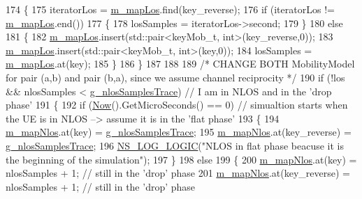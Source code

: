 \begin{DoxyCode}
174         \{
175                 iteratorLos = \hyperlink{classns3_1_1MmWaveLosTracker_a1ccd3a19ade5ca4b1e94bd113c593cd3}{m\_mapLos}.find(key\_reverse);
176                 \textcolor{keywordflow}{if} (iteratorLos != \hyperlink{classns3_1_1MmWaveLosTracker_a1ccd3a19ade5ca4b1e94bd113c593cd3}{m\_mapLos}.end())
177                 \{
178                         losSamples = iteratorLos->second;
179                 \} 
180                 \textcolor{keywordflow}{else}
181                 \{
182                         \hyperlink{classns3_1_1MmWaveLosTracker_a1ccd3a19ade5ca4b1e94bd113c593cd3}{m\_mapLos}.insert(std::pair<keyMob\_t, int>(key\_reverse,0));
183                         \hyperlink{classns3_1_1MmWaveLosTracker_a1ccd3a19ade5ca4b1e94bd113c593cd3}{m\_mapLos}.insert(std::pair<keyMob\_t, int>(key,0));
184                         losSamples = \hyperlink{classns3_1_1MmWaveLosTracker_a1ccd3a19ade5ca4b1e94bd113c593cd3}{m\_mapLos}.at(key);
185                 \}
186         \}
187 
188 
189         \textcolor{comment}{/* CHANGE BOTH MobilityModel for pair (a,b) and pair (b,a), since we assume channel reciprocity */}
190         \textcolor{keywordflow}{if} (!los && nlosSamples < \hyperlink{namespacens3_aa27c343924716ad4dac244babcba8297}{g\_nlosSamplesTrace}) \textcolor{comment}{// I am in NLOS and in the 'drop
       phase'}
191         \{
192                 \textcolor{keywordflow}{if} (\hyperlink{group__simulator_gac3635e2e87f7ce316c89290ee1b01d0d}{Now}().GetMicroSeconds() == 0) \textcolor{comment}{// simualtion starts when the UE is in NLOS --> assume
       it is in the 'flat phase'}
193                 \{
194                         \hyperlink{classns3_1_1MmWaveLosTracker_ab8a492fa8798f2f775de311a6e619b19}{m\_mapNlos}.at(key) = \hyperlink{namespacens3_aa27c343924716ad4dac244babcba8297}{g\_nlosSamplesTrace};
195                         \hyperlink{classns3_1_1MmWaveLosTracker_ab8a492fa8798f2f775de311a6e619b19}{m\_mapNlos}.at(key\_reverse) = \hyperlink{namespacens3_aa27c343924716ad4dac244babcba8297}{g\_nlosSamplesTrace};
196                         \hyperlink{group__logging_ga88acd260151caf2db9c0fc84997f45ce}{NS\_LOG\_LOGIC}(\textcolor{stringliteral}{"NLOS in flat phase beacuse it is the beginning of the
       simulation"});
197                 \}
198                 \textcolor{keywordflow}{else}
199                 \{
200                         \hyperlink{classns3_1_1MmWaveLosTracker_ab8a492fa8798f2f775de311a6e619b19}{m\_mapNlos}.at(key) = nlosSamples + 1; \textcolor{comment}{// still in the 'drop' phase}
201                         \hyperlink{classns3_1_1MmWaveLosTracker_ab8a492fa8798f2f775de311a6e619b19}{m\_mapNlos}.at(key\_reverse) = nlosSamples + 1; \textcolor{comment}{// still in the 'drop' phase}

\end{DoxyCode}
